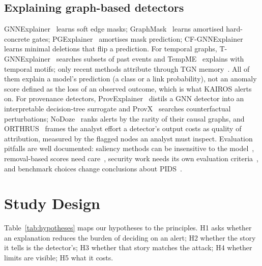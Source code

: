 \documentclass[conference]{IEEEtran}
\begin{document}
\subsection{Explaining graph-based detectors}
GNNExplainer~\cite{gnnexplainer} learns soft edge masks; GraphMask~\cite{graphmask} learns amortised
hard-concrete gates; PGExplainer~\cite{pgexplainer} amortises mask prediction; CF-GNNExplainer~\cite{cfgnnexplainer}
learns minimal deletions that flip a prediction. For temporal graphs, T-GNNExplainer~\cite{tgnnexplainer}
searches subsets of past events and TempME~\cite{tempme} explains with temporal motifs; only recent
methods attribute through TGN memory~\cite{memexplainer,xiong}. All of them explain a model's prediction (a
class or a link probability), not an anomaly score defined as the loss of an observed outcome, which is
what KAIROS alerts on. For provenance detectors, ProvExplainer~\cite{provexplainer} distils
a GNN detector into an interpretable decision-tree surrogate and ProvX~\cite{provx} searches counterfactual perturbations;
NoDoze~\cite{nodoze} ranks alerts by the rarity of their causal graphs, and ORTHRUS~\cite{orthrus} frames
the analyst effort a detector's output costs as quality of attribution, measured by the flagged nodes an
analyst must inspect. Evaluation pitfalls are well documented: saliency methods can be
insensitive to the model~\cite{adebayo}, removal-based scores need care~\cite{hooker}, security work needs
its own evaluation criteria~\cite{warnecke,arp}, and benchmark choices change conclusions about PIDS~\cite{bilot,guerra}.
\section{Study Design}
\label{sec:design}
Table~\ref{tab:hypotheses} maps our hypotheses to the principles. H1 asks whether an explanation reduces
the burden of deciding on an alert; H2 whether the story it tells is the detector's; H3 whether that story
matches the attack; H4 whether limits are visible; H5 what it costs.
\end{document}
